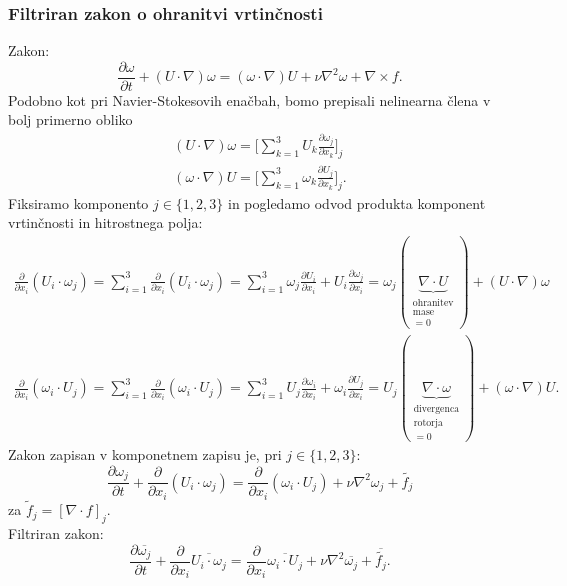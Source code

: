 \documentclass[mat2, tisk]{fmfdelo}
\begin{document}
\subsubsection{Filtriran zakon o ohranitvi vrtinčnosti}

Zakon:
$$
\frac{\partial \omega}{\partial t} + (U\cdot \nabla)\omega = (\omega \cdot \nabla)U + \nu \nabla^2 \omega + \nabla \times f. 
$$
Podobno kot pri Navier-Stokesovih enačbah, bomo prepisali nelinearna člena v bolj primerno 
obliko
\begin{align*}
(U \cdot \nabla) \omega = \Big[\sum_{k=1}^3 U_k \frac{\partial \omega_j}{\partial x_k}\Big]_j\\
(\omega \cdot \nabla) U= \Big[\sum_{k=1}^3 \omega_k \frac{\partial U_j}{\partial x_k}\Big]_j.
\end{align*}
Fiksiramo komponento $j\in\{1, 2, 3\}$ in pogledamo odvod produkta komponent vrtinčnosti in hitrostnega polja:
\begin{align*}
\frac{\partial}{\partial x_i} (U_i \cdot\omega_j) = \sum_{i=1}^3 \frac{\partial}{\partial x_i} (U_i \cdot\omega_j) = 
\sum_{i=1}^3 \omega_j\frac{\partial U_i}{\partial x_i} + U_i\frac{\partial \omega_j}{\partial x_i} = 
\omega_j (\underbrace{\nabla \cdot U}_{\substack{\text{ohranitev}\\\text{mase}\\=0}}) + (U\cdot\nabla)\omega
\end{align*}
\begin{align*}
\frac{\partial}{\partial x_i} (\omega_i \cdot U_j) = \sum_{i=1}^3 \frac{\partial}{\partial x_i} (\omega_i \cdot U_j) = 
\sum_{i=1}^3 U_j\frac{\partial \omega_i}{\partial x_i} + \omega_i\frac{\partial U_j}{\partial x_i} = 
U_j (\underbrace{\nabla \cdot \omega}_{\substack{\text{divergenca}\\\text{rotorja}\\=0}}) + (\omega\cdot\nabla)U.
\end{align*}
Zakon zapisan v komponetnem zapisu je, pri $j\in \{1, 2, 3\}$:
\begin{equation}
\frac{\partial \omega_j}{\partial t} + \frac{\partial}{\partial x_i} (U_i \cdot \omega_j) = 
\frac{\partial}{\partial x_i} (\omega_i \cdot U_j) + \nu \nabla^2 \omega_j + \tilde{f_j}
\end{equation}
za $\tilde{f}_j = [\nabla \cdot f]_j$.\\
Filtriran zakon:
\begin{equation}
  \frac{\partial \overline{\omega_j}}{\partial t} + \frac{\partial}{\partial x_i} \overline{U_i \cdot \omega_j} = 
  \frac{\partial}{\partial x_i} \overline{\omega_i \cdot U_j} + \nu \nabla^2 \overline{\omega_j} + \overline{\tilde{f_j}}.
\end{equation}
\end{document}
